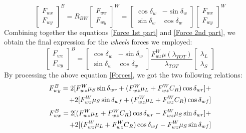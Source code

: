 		\begin{equation} \label{Force 2nd part}
			\begin{bmatrix}
				F_{wx} \\
				F_{wy}
			\end{bmatrix}^{B} =	
		R_{BW}
			\begin{bmatrix}
				F_{wx} \\
				F_{wy}
				\end{bmatrix}^{W} =
				\begin{bmatrix}
				\cos\delta_{w} & -\sin\delta_{w} \\
				\sin\delta_{w} & \cos\delta_{w}
			\end{bmatrix}
			\begin{bmatrix}
				F_{wx} \\
				F_{wy}
			\end{bmatrix}^{W}
		\end{equation}
	Combining together the equations \ref{Force 1st part} and \ref{Force 2nd part}, we obtain the final expression for the \textit{wheels} forces we employed:
		\begin{equation} \label{Forces}
			\begin{bmatrix}
		F_{wx} \\
		F_{wy}
			\end{bmatrix}^{B} =	
			\begin{bmatrix}
				\cos\delta_{w} & -\sin\delta_{w} \\
				\sin\delta_{w} & \cos\delta_{w}
			\end{bmatrix}
				\frac{F_{wz}^{W} \mu(\lambda_{TOT})}{\lambda_{TOT}}
			\begin{bmatrix}
				\lambda_{L} \\
				\lambda_{S}
			\end{bmatrix}
		\end{equation}
	By processing the above equation \ref{Forces}, we got the two following relations:
		\begin{equation} \label{F_{wy}}
			\begin{split}
				F_{wy}^{B} = 2 [F_{wz}^{W} \mu_{S}\sin\delta_{wr} + (F_{wz}^{W} \mu_{L} + F_{wz}^{W} C_{R}) \cos\delta_{wr}] + \\ + 2 [F_{wz}^{W} \mu_{S}\sin\delta_{wf} + (F_{wz}^{W} \mu_{L} + F_{wz}^{W} C_{R})\cos\delta_{wf}] 
			\end{split}
		\end{equation}
		\begin{equation} \label{F_{wx}}
			\begin{split}
				F_{wx}^{B} = 2 [(F_{wz}^{W} \mu_{L} + F_{wz}^{W} C_{R})\cos\delta_{wr} - F_{wz}^{W} \mu_{S}\sin\delta_{wr}] + \\ + 2 [(F_{wz}^{W} \mu_{L} + F_{wz}^{W} C_{R})\cos\delta_{wf} - F_{wz}^{W} \mu_{S}\sin\delta_{wf}] 
			\end{split}
		\end{equation}

